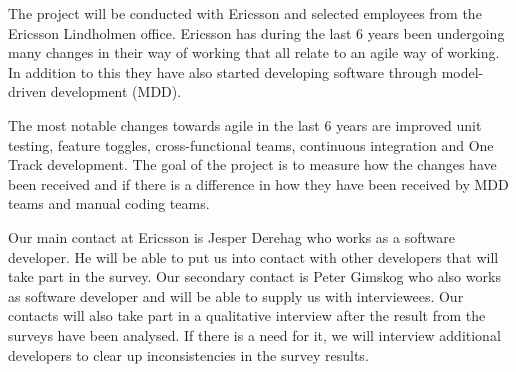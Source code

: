 \documentclass[ProjectPlan_innit.tex]{subfiles}
\begin{document}
The project will be conducted with Ericsson and selected employees from the Ericsson Lindholmen office. Ericsson has during the last 6 years been undergoing many changes in their way of working that all relate to an agile way of working. In addition to this they have also started developing software through model-driven development (MDD). 
\smallskip

The most notable changes towards agile in the last 6 years are improved unit testing, feature toggles, cross-functional teams, continuous integration and One Track development. The goal of the project is to measure how the changes have been received and if there is a difference in how they have been received by MDD teams and manual coding teams. 
\smallskip

Our main contact at Ericsson is Jesper Derehag who works as a software developer. He will be able to put us into contact with other developers that will take part in the survey. Our secondary contact is Peter Gimskog who also works as software developer and will be able to supply us with interviewees. Our contacts will also take part in a qualitative interview after the result from the surveys have been analysed. If there is a need for it, we will interview additional developers to clear up inconsistencies in the survey results. 
\end{document}

